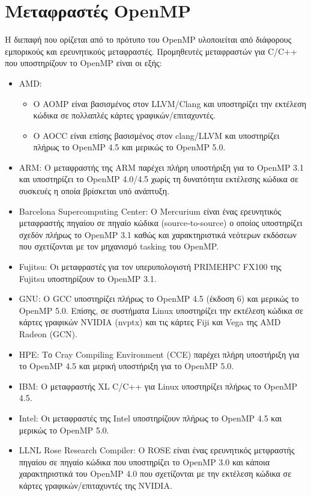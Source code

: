 \section{Μεταφραστές OpenMP}
Η διεπαφή που ορίζεται από το πρότυπο του OpenMP υλοποιείται από διάφορους εμπορικούς και ερευνητικούς μεταφραστές. Προμηθευτές μεταφραστών για C/C++ που υποστηρίζουν το OpenMP είναι οι εξής:

\begin{itemize}
	\item AMD: 
	\begin{itemize}
		\item Ο AOMP είναι βασισμένος στον LLVM/Clang και υποστηρίζει την εκτέλεση κώδικα σε πολλαπλές κάρτες γραφικών/επιταχυντές.
		\item Ο AOCC είναι επίσης βασισμένος στον clang/LLVM και υποστηρίζει πλήρως το OpenMP 4.5 και μερικώς το OpenMP 5.0.
	\end{itemize}
	\item ARM: Ο μεταφραστής της ARM παρέχει πλήρη υποστήριξη για το OpenMP 3.1 και υποστηρίζει το OpenMP 4.0/4.5 χωρίς τη δυνατότητα εκτέλεσης κώδικα σε συσκευές η οποία βρίσκεται υπό ανάπτυξη.
	\item Barcelona Supercomputing Center: Ο Mercurium είναι ένας ερευνητικός μεταφραστής πηγαίου σε πηγαίο κώδικα (source-to-source) ο οποίος υποστηρίζει σχεδόν πλήρως το OpenMP 3.1 καθώς και χαρακτηριστικά νεότερων εκδόσεων που σχετίζονται με τον μηχανισμό tasking του OpenMP.
	\item Fujitsu: Οι μεταφραστές για τον υπερυπολογιστή PRIMEHPC FX100 της Fujitsu υποστηρίζουν το OpenMP 3.1.
	\item GNU: Ο GCC υποστηρίζει πλήρως το OpenMP 4.5 (έκδοση 6) και μερικώς το OpenMP 5.0. Επίσης, σε συστήματα Linux υποστηρίζει την εκτέλεση κώδικα σε κάρτες γραφικών NVIDIA (nvptx) και τις κάρτες Fiji και Vega της AMD Radeon (GCN).
	\item HPE: Το Cray Compiling Environment (CCE) παρέχει πλήρη υποστήριξη για το OpenMP 4.5 και μερική υποστήριξη για το OpenMP 5.0.
	\item IBM: Ο μεταφραστής XL C/C++ για Linux υποστηρίζει πλήρως το OpenMP 4.5.
	\item Intel: Οι μεταφραστές της Intel υποστηρίζουν πλήρως το OpenMP 4.5 και μερικώς το OpenMP 5.0.
	\item LLNL Rose Research Compiler: Ο ROSE είναι ένας ερευνητικός μετφραστής πηγαίου σε πηγαίο κώδικα που υποστηρίζει το OpenMP 3.0 και κάποια χαρακτηριστικά του OpenMP 4.0 που σχετίζονται με την εκτέλεση κώδικα σε κάρτες γραφικών/επιταχυντές της NVIDIA.

\end{itemize}
